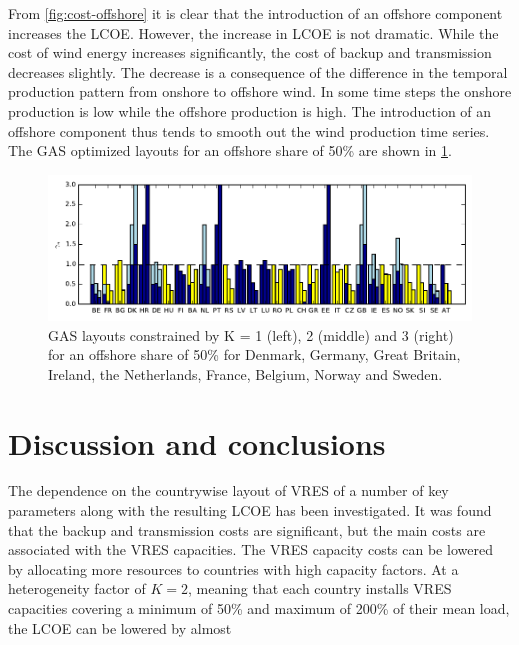 \documentclass[a4paper, 5p, sort&compress]{elsarticle}%
\begin{document}
From \cref{fig:cost-offshore} it is clear that the introduction of an
offshore component increases the LCOE. However, the increase in LCOE
is not dramatic. While the cost of wind energy increases
significantly, the cost of backup and transmission decreases
slightly. The decrease is a consequence of the difference in the
temporal production pattern from onshore to offshore wind. In some
time steps the onshore production is low while the offshore production
is high. The introduction of an offshore component thus tends to
smooth out the wind production time series. %
The GAS optimized layouts for
an offshore share of 50\% are shown in \cref{fig:layout-offshore}.

\begin{figure}[t!]
  \centering
  \includegraphics[width = 2\columnwidth, center]{offshoreLayouts}
  \caption{GAS layouts constrained by K = 1 (left), 2 (middle) and 3
    (right) for an offshore share of 50\% for Denmark, Germany, Great
    Britain, Ireland, the Netherlands, France, Belgium, Norway and
    Sweden.}
  \label{fig:layout-offshore}
\end{figure}

\section{Discussion and conclusions}
\label{sec:four}

The dependence on the countrywise layout of VRES of a number of key
parameters along with the resulting LCOE has been investigated. It was
found that the backup and transmission costs are significant, but the main
costs are associated with the VRES capacities. The VRES capacity costs
can be lowered by allocating more resources to countries with high
capacity factors. At a heterogeneity factor of $K = 2$, meaning that
each country installs VRES capacities covering a minimum of 50\% and
maximum of 200\% of their mean load, the LCOE can be lowered by almost
\end{document}
